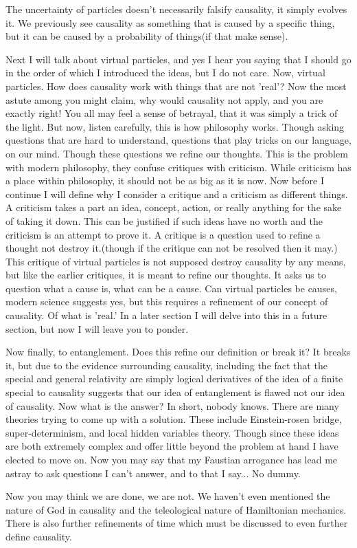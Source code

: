\par The uncertainty of particles doesn't necessarily falsify causality, it simply evolves it. We previously see causality as something that is caused by a specific thing, but it can be caused by a probability of things(if that make sense). 

\par Next I will talk about virtual particles, and yes I hear you saying that I should go in the order of which I introduced the ideas, but I do not care. Now, virtual particles. How does causality work with things that are not 'real'? Now the most astute among you might claim, why would causality not apply, and you are exactly right! You all may feel a sense of betrayal,  that it was simply a trick of the light. But now, listen carefully, this is how philosophy works. Though asking questions that are hard to understand, questions that play tricks on our language, on our mind. Though these questions we refine our thoughts. This is the problem with modern philosophy, they confuse critiques with criticism. While criticism has a place within philosophy, it should not be as big as it is now. Now before I continue I will define why I consider a critique and a criticism as different things. A criticism takes a part an idea, concept, action, or really anything for the sake of taking it down. This can be justified if such ideas have no worth and the criticism is an attempt to prove it. A critique is a question used to refine a thought not destroy it.(though if the critique can not be resolved then it may.) This critique of virtual particles is not supposed destroy causality by any means, but like the earlier critiques, it is meant to refine our thoughts. It asks us to question what a cause is, what can be a cause. Can virtual particles be causes, modern science suggests yes, but this requires a refinement of our concept of causality. Of what is 'real.' In a later section I will delve into this in a future section, but now I will leave you to ponder.
\par Now finally, to entanglement. Does this refine our definition or break it? It breaks it, but due to the evidence surrounding causality, including the fact that the special and general relativity are simply logical derivatives of the idea of a finite special to causality suggests that our idea of entanglement is flawed not our idea of causality. Now what is the answer? In short, nobody knows. There are many theories trying to come up with a solution. These include Einstein-rosen bridge, super-determinism, and local hidden variables theory. Though since these ideas are both extremely complex and offer little beyond the problem at hand I have elected to move on. Now you may say that my Faustian arrogance has lead me astray to ask questions I can't answer, and to that I say... No dummy.
\par Now you may think we are done, we are not. We haven't even mentioned the nature of God in causality and the teleological nature of Hamiltonian mechanics. There is also further refinements of time which must be discussed to even further define causality. 

